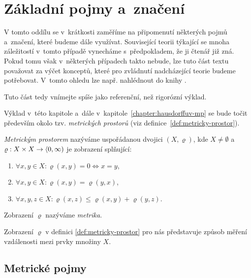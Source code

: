 \section{Základní pojmy a~značení}\label{sec:zakladni-pojmy-a-znaceni}

V tomto oddílu se v~krátkosti zaměříme na připomenutí některých pojmů a~značení, které budeme dále využívat. Související teorii týkající se mnoha záležitostí v~tomto případě vynecháme s~předpokladem, že ji čtenář již zná. Pokud tomu však v~některých případech takto nebude, lze tuto část textu považovat za výčet konceptů, které pro zvládnutí nadcházející teorie budeme potřebovat. V~tomto ohledu lze např. nahlédnout do knihy \cite{NetukaAnalyza2014}.

Tuto část tedy vnímejte spíše jako referenční, než rigorózní výklad.

Výklad v~této kapitole a~dále v~kapitole~\ref{chapter:hausdorffuv-mp} se bude točit především okolo tzv. \emph{metrických prostorů} (viz definice~\ref{def:metricky-prostor}).
\begin{definition}\label{def:metricky-prostor}
    \emph{Metrickým prostorem} nazýváme uspořádanou dvojici $(X,\varrho)$, kde $X\neq\emptyset$ a~$\varrho:X\times X \rightarrow \langle0,\infty)$ je zobrazení splňující:
    \begin{enumerate}[label=(\alph*)]
        \item $\forall x,y\in X: \varrho(x,y)=0\iff x=y$,
        \item $\forall x,y\in X: \varrho(x,y)=\varrho(y,x)$,
        \item $\forall x,y,z\in X: \varrho(x,z)\leqslant\varrho(x,y)+\varrho(y,z)$.
    \end{enumerate}
    Zobrazení $\varrho$ nazýváme \emph{metrika}.
\end{definition}
Zobrazení $\varrho$ v definici \ref{def:metricky-prostor} pro nás představuje způsob měření vzdálenosti mezi prvky množiny $X$. 

\subsection{Metrické pojmy}\label{subsec:metricke-pojmy}

